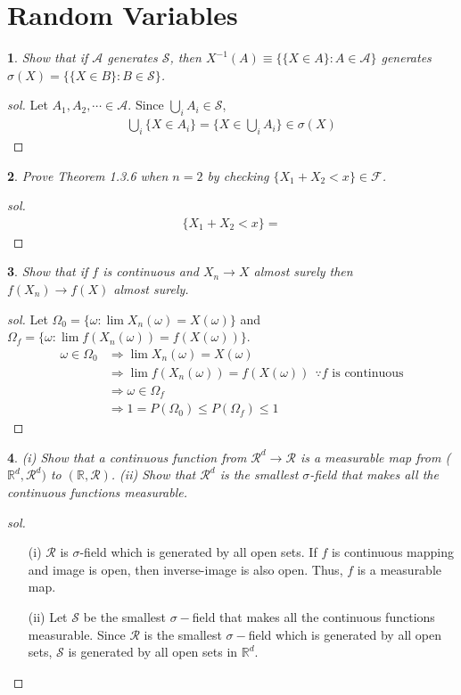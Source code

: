 \documentclass{report}
\newtheorem{ex}{}[section]
\begin{document}
\section{Random Variables}
\begin{ex}
Show that if $\mathcal{A}$ generates $\mathcal{S}$, then $X^{-1}(A) \equiv \{\{X \in A\} : A \in \mathcal{A}\}$ generates $\sigma(X) = \{\{X \in B\} : B \in \mathcal{S}\}$.
\end{ex}
\begin{proof}[sol]
Let $A_1,A_2,\dotsb \in \mathcal{A}$. Since $\bigcup_i A_i \in \mathcal{S}$,
\begin{align*}
    \bigcup_i \{X \in A_i\} = \{X \in \bigcup_i A_i\} \in \sigma(X)
\end{align*}
\end{proof}
\begin{ex}
Prove Theorem 1.3.6 when $n = 2$ by checking $\{X_1+X_2 < x\} \in \mathcal{F}$.
\end{ex}
\begin{proof}[sol]
\begin{align*}
    \{X_1+X_2 < x\} = 
\end{align*}
\end{proof}
\begin{ex}
Show that if $f$ is continuous and $X_n \to X$ almost surely then $f(X_n) \to f(X)$ almost surely.
\end{ex}
\begin{proof}[sol]
Let $\Omega_0 = \{\omega : \lim X_n(\omega) = X(\omega)\}$ and $\Omega_f = \{\omega : \lim f(X_n(\omega)) = f(X(\omega))\}$.
\begin{align*}
    \omega \in \Omega_0 &\Rightarrow \lim X_n(\omega) = X(\omega)\\
    &\Rightarrow \lim f(X_n(\omega)) = f(X(\omega))  \ \ \because f\text{ is continuous}\\
    &\Rightarrow \omega \in \Omega_f\\
    &\Rightarrow 1 = P(\Omega_0) \le P(\Omega_f)\le 1
\end{align*}
\end{proof}
\begin{ex}
(i) Show that a continuous function from $\mathcal{R}^d \to \mathcal{R}$ is a measurable map from ($\mathbb{R}^d,\mathcal{R}^d)$ to $(\mathbb{R},\mathcal{R})$. (ii) Show that $\mathcal{R}^d$ is the smallest $\sigma$-field that makes all the continuous functions measurable.
\end{ex}
\begin{proof}[sol]~
\begin{enumerate}
    \item[(i)] $\mathcal{R}$ is $\sigma$-field which is generated by all open sets. If $f$ is continuous mapping and image is open, then inverse-image is also open. Thus, $f$ is a measurable map.
    \item[(ii)] Let $\mathcal{S}$ be the smallest $\sigma-$field that makes all the continuous functions measurable. Since $\mathcal{R}$ is the smallest $\sigma-$field which is generated by all open sets,  $\mathcal{S}$ is generated by all open sets in $\mathbb{R}^d$.
\end{enumerate}
\end{proof}
\end{document}

